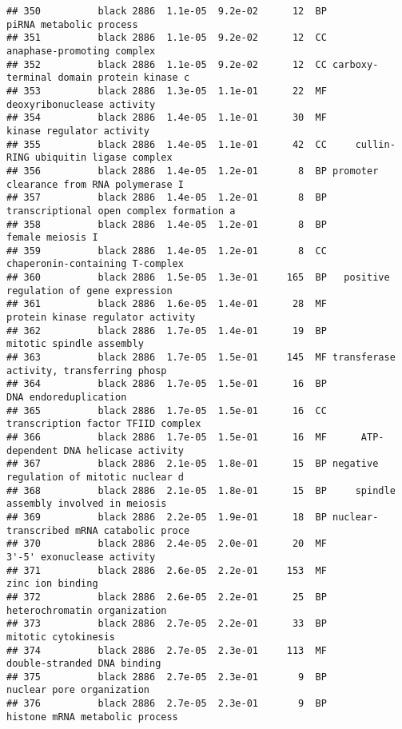 \documentclass[]{article}
\begin{document}
\begin{verbatim}
## 350          black 2886  1.1e-05  9.2e-02      12  BP                  piRNA metabolic process
## 351          black 2886  1.1e-05  9.2e-02      12  CC               anaphase-promoting complex
## 352          black 2886  1.1e-05  9.2e-02      12  CC carboxy-terminal domain protein kinase c
## 353          black 2886  1.3e-05  1.1e-01      22  MF               deoxyribonuclease activity
## 354          black 2886  1.4e-05  1.1e-01      30  MF                kinase regulator activity
## 355          black 2886  1.4e-05  1.1e-01      42  CC     cullin-RING ubiquitin ligase complex
## 356          black 2886  1.4e-05  1.2e-01       8  BP promoter clearance from RNA polymerase I
## 357          black 2886  1.4e-05  1.2e-01       8  BP transcriptional open complex formation a
## 358          black 2886  1.4e-05  1.2e-01       8  BP                         female meiosis I
## 359          black 2886  1.4e-05  1.2e-01       8  CC          chaperonin-containing T-complex
## 360          black 2886  1.5e-05  1.3e-01     165  BP   positive regulation of gene expression
## 361          black 2886  1.6e-05  1.4e-01      28  MF        protein kinase regulator activity
## 362          black 2886  1.7e-05  1.4e-01      19  BP                 mitotic spindle assembly
## 363          black 2886  1.7e-05  1.5e-01     145  MF transferase activity, transferring phosp
## 364          black 2886  1.7e-05  1.5e-01      16  BP                    DNA endoreduplication
## 365          black 2886  1.7e-05  1.5e-01      16  CC       transcription factor TFIID complex
## 366          black 2886  1.7e-05  1.5e-01      16  MF      ATP-dependent DNA helicase activity
## 367          black 2886  2.1e-05  1.8e-01      15  BP negative regulation of mitotic nuclear d
## 368          black 2886  2.1e-05  1.8e-01      15  BP     spindle assembly involved in meiosis
## 369          black 2886  2.2e-05  1.9e-01      18  BP nuclear-transcribed mRNA catabolic proce
## 370          black 2886  2.4e-05  2.0e-01      20  MF               3'-5' exonuclease activity
## 371          black 2886  2.6e-05  2.2e-01     153  MF                         zinc ion binding
## 372          black 2886  2.6e-05  2.2e-01      25  BP             heterochromatin organization
## 373          black 2886  2.7e-05  2.2e-01      33  BP                      mitotic cytokinesis
## 374          black 2886  2.7e-05  2.3e-01     113  MF              double-stranded DNA binding
## 375          black 2886  2.7e-05  2.3e-01       9  BP                nuclear pore organization
## 376          black 2886  2.7e-05  2.3e-01       9  BP           histone mRNA metabolic process

\end{verbatim}
\end{document}
